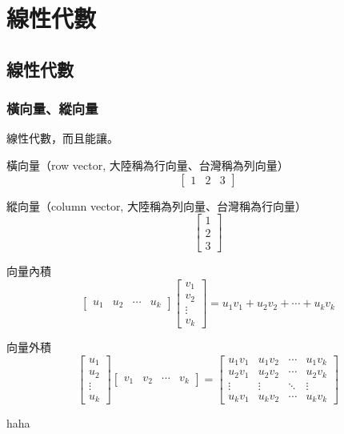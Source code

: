 \chapter{線性代數}

\section{線性代數}

\subsection{橫向量、縱向量}
線性代數，而且能讓。

橫向量（row vector, 大陸稱為行向量、台灣稱為列向量）
\[\begin{bmatrix} 1 & 2 & 3 \end{bmatrix}\]

縱向量（column vector, 大陸稱為列向量、台灣稱為行向量）
\[\begin{bmatrix} 
    1 \\ 
    2 \\ 
    3 
  \end{bmatrix}\]
    
向量內積
\[\begin{bmatrix} 
    u_1 & u_2 & \cdots & u_k 
  \end{bmatrix}\begin{bmatrix} 
    v_1 \\
    v_2 \\
    \vdots \\
    v_k 
  \end{bmatrix} = u_1v_1 + u_2v_2 + \cdots + u_kv_k\]
  
向量外積
\[\begin{bmatrix} 
    u_1 \\
    u_2 \\
    \vdots \\
    u_k 
  \end{bmatrix}\begin{bmatrix} 
    v_1 & v_2 & \cdots & v_k 
  \end{bmatrix} = \begin{bmatrix}
    u_1v_1 & u_1v_2 & \cdots & u_1v_k\\
    u_2v_1 & u_2v_2 & \cdots & u_2v_k\\
    \vdots & \vdots & \ddots & \vdots\\
    u_kv_1 & u_kv_2 & \cdots & u_kv_k\end{bmatrix}\]

\begin{note}
haha
\end{note}
